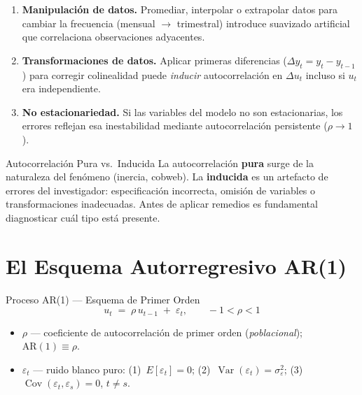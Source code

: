 \documentclass[11pt, letterpaper]{article}
\begin{document}
\begin{enumerate}[label=\textbf{\arabic*.}]
  \item \textbf{Manipulaci\'on de datos.}
  Promediar, interpolar o extrapolar datos para cambiar la frecuencia
  (mensual $\to$ trimestral) introduce suavizado artificial que correlaciona
  observaciones adyacentes.

  \item \textbf{Transformaciones de datos.}
  Aplicar primeras diferencias ($\Delta y_t = y_t - y_{t-1}$) para corregir
  colinealidad puede \emph{inducir} autocorrelaci\'on en $\Delta u_t$ incluso
  si $u_t$ era independiente.

  \item \textbf{No estacionariedad.}
  Si las variables del modelo no son estacionarias, los errores reflejan
  esa inestabilidad mediante autocorrelaci\'on persistente ($\rho \to 1$).

\end{enumerate}

\begin{nota}{Autocorrelaci\'on Pura vs.\ Inducida}
La autocorrelaci\'on \textbf{pura} surge de la naturaleza del fen\'omeno
(inercia, cobweb). La \textbf{inducida} es un artefacto de errores del
investigador: especificaci\'on incorrecta, omisi\'on de variables o
transformaciones inadecuadas. Antes de aplicar remedios es fundamental
diagnosticar cu\'al tipo est\'a presente.
\end{nota}

\section{El Esquema Autorregresivo AR(1)}

\begin{definicion}{Proceso AR(1) --- Esquema de Primer Orden}
\[
  \boxed{u_t \;=\; \rho\, u_{t-1} \;+\; \varepsilon_t},
  \qquad -1 < \rho < 1
\]
\begin{itemize}
  \item $\rho$ --- coeficiente de autocorrelaci\'on de primer orden
    (\emph{poblacional}); $\mathrm{AR}(1) \equiv \rho$.
  \item $\varepsilon_t$ --- ruido blanco puro:
    (1)~$E[\varepsilon_t]=0$; \;
    (2)~$\operatorname{Var}(\varepsilon_t)=\sigma_\varepsilon^2$; \;
    (3)~$\operatorname{Cov}(\varepsilon_t,\varepsilon_s)=0$, $t\neq s$.
\end{itemize}
\end{definicion}
\end{document}
